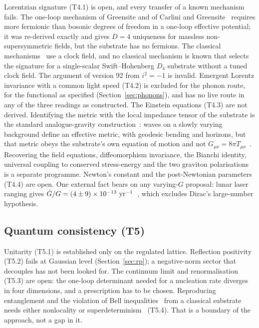 \documentclass[a4paper,11pt]{article}
\numberwithin{equation}{section}
\theoremstyle{jsplain}
\theoremstyle{jsrem}
\begin{document}
Lorentzian signature (T4.1) is open, and every transfer of a known mechanism fails. The one-loop mechanism of Greensite and of Carlini and Greensite~\cite{ref41,ref42} requires more fermionic than bosonic degrees of freedom in a one-loop effective potential; it was re-derived exactly and gives $D=4$ uniqueness for massless non-supersymmetric fields, but the substrate has no fermions. The classical mechanisms~\cite{ref17,ref18} use a clock field, and no classical mechanism is known that selects the signature for a single-scalar Swift--Hohenberg $D_4$ substrate without a tuned clock field. The argument of version 92 from $i^2=-1$ is invalid. Emergent Lorentz invariance with a common light speed (T4.2) is excluded for the phonon route, for the functional as specified (Section~\ref{sec:phonons}), and has no live route in any of the three readings as constructed. The Einstein equations (T4.3) are not derived. Identifying the metric with the local impedance tensor of the substrate is the standard analogue-gravity construction~\cite{ref16}: waves on a slowly varying background define an effective metric, with geodesic bending and horizons, but that metric obeys the substrate's own equation of motion and not $G_{\mu\nu}=8\pi T_{\mu\nu}$~\cite{ref19}. Recovering the field equations, diffeomorphism invariance, the Bianchi identity, universal coupling to conserved stress-energy and the two graviton polarisations is a separate programme. Newton's constant and the post-Newtonian parameters (T4.4) are open. One external fact bears on any varying-$G$ proposal: lunar laser ranging gives $\dot G/G=(4\pm9)\times10^{-13}\ {\rm yr}^{-1}$~\cite{ref50}, which excludes Dirac's large-number hypothesis.

\subsection{Quantum consistency (T5)}

Unitarity (T5.1) is established only on the regulated lattice. Reflection positivity (T5.2) fails at Gaussian level (Section~\ref{sec:rp}); a negative-norm sector that decouples has not been looked for. The continuum limit and renormalisation (T5.3) are open: the one-loop determinant needed for a nucleation rate diverges in four dimensions, and a prescription has to be chosen. Reproducing entanglement and the violation of Bell inequalities~\cite{ref37} from a classical substrate needs either nonlocality or superdeterminism~\cite{ref38} (T5.4). That is a boundary of the approach, not a gap in it.
\end{document}
